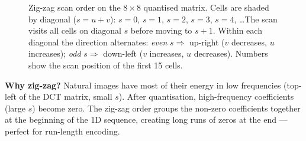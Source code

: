 \begin{figure}[H]
\caption{Zig-zag scan order on the $8\times8$ quantised matrix. Cells are shaded by diagonal ($s=u+v$): \textcolor{orange!80!black}{$s=0$}, \textcolor{blue!60!black}{$s=1$}, \textcolor{green!60!black}{$s=2$}, \textcolor{purple!60!black}{$s=3$}, \textcolor{red!60!black}{$s=4$}, \ldots The scan visits all cells on diagonal $s$ before moving to $s+1$. Within each diagonal the direction alternates: \emph{even} $s \Rightarrow$ up-right ($v$ decreases, $u$ increases); \emph{odd} $s \Rightarrow$ down-left ($v$ increases, $u$ decreases). Numbers show the scan position of the first 15 cells.}
\label{fig:zigzag}
\end{figure}

\textbf{Why zig-zag?} Natural images have most of their energy in low frequencies (top-left of the DCT matrix, small $s$). After quantisation, high-frequency coefficients (large $s$) become zero. The zig-zag order groups the non-zero coefficients together at the beginning of the 1D sequence, creating long runs of zeros at the end — perfect for run-length encoding.


